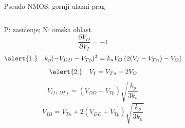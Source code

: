 \begin{frame}[label=09_2-s020]{Pseudo NMOS: gornji ulazni prag}
\begin{columns}[T,onlytextwidth]\centering {}P: zasićenje; N: omska oblast.
\[\frac{\partial V_O}{\partial V_I}=-1\]
\[\alert{1.}\quad k_p(-V_{DD}-V_{Tp})^2=k_nV_O\left(2(V_I-V_{Tn})-V_O\right)\]
\[\alert{2.}\quad V_I=V_{Tn}+2V_O\]
\[V_{O(IH)}=(V_{DD}+V_{Tp})\sqrt{\frac{k_p}{3k_n}}\]
\[V_{IH}=V_{Tn}+2(V_{DD}+V_{Tp})\sqrt{\frac{k_p}{3k_n}}\]
\end{columns}
\end{frame}
